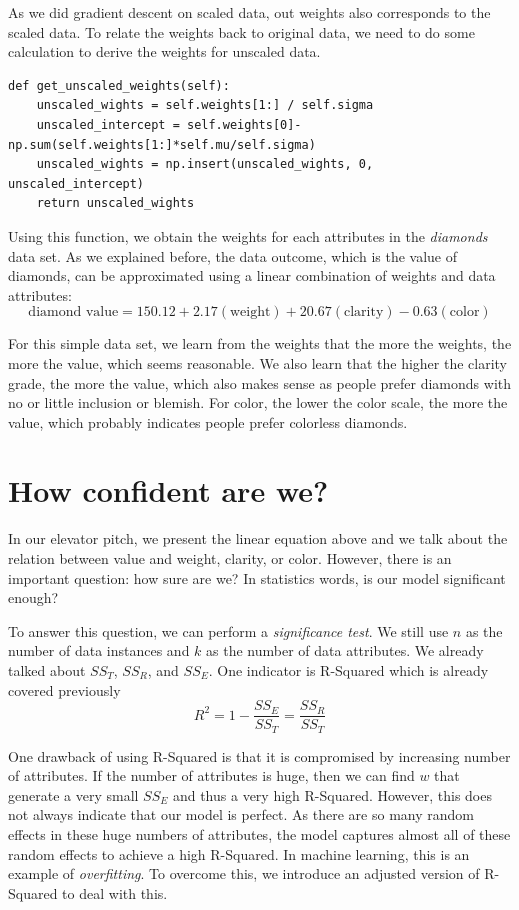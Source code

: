 \documentclass[
	letterpaper
]{article}
\begin{document}
As we did gradient descent on scaled data, out weights also corresponds to the scaled data.
To relate the weights back to original data, we need to do some calculation to derive the weights for unscaled data.
\begin{lstlisting}
def get_unscaled_weights(self):
    unscaled_wights = self.weights[1:] / self.sigma
    unscaled_intercept = self.weights[0]-np.sum(self.weights[1:]*self.mu/self.sigma)
    unscaled_wights = np.insert(unscaled_wights, 0, unscaled_intercept)
    return unscaled_wights
\end{lstlisting}

Using this function, we obtain the weights for each attributes in the \textit{diamonds} data set.
As we explained before, the data outcome, which is the value of diamonds, can be approximated using a linear combination of weights and data attributes:
\begin{equation}
\text{diamond value} = 150.12+ 2.17 (\text{weight}) + 20.67(\text{clarity})-0.63(\text{color})
\end{equation}

For this simple data set, we learn from the weights that the more the weights, the more the value, which seems reasonable.
We also learn that the higher the clarity grade, the more the value, which also makes sense as people prefer diamonds with no or little inclusion or blemish.
For color, the lower the color scale, the more the value, which probably indicates people prefer colorless diamonds.

\section{How confident are we?}
In our elevator pitch, we present the linear equation above and we talk about the relation between value and weight, clarity, or color.
However, there is an important question: how sure are we?
In statistics words, is our model significant enough?

To answer this question, we can perform a \textit{significance test}.
We still use $n$ as the number of data instances and $k$ as the number of data attributes.
We already talked about $SS_T$, $SS_R$, and $SS_E$.
One indicator is R-Squared which is already covered previously
\begin{equation}
R^2 = 1 - \frac{SS_E}{SS_T} = \frac{SS_R}{SS_T}
\end{equation}

One drawback of using R-Squared is that it is compromised by increasing number of attributes.
If the number of attributes is huge, then we can find $w$ that generate a very small $SS_E$ and thus a very high R-Squared.
However, this does not always indicate that our model is perfect.
As there are so many random effects in these huge numbers of attributes, the model captures almost all of these random effects to achieve a high R-Squared.
In machine learning, this is an example of \textit{overfitting}.
To overcome this, we introduce an adjusted version of R-Squared to deal with this.
\end{document}
